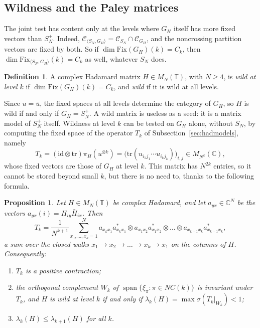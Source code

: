 \documentclass[11pt]{amsart}
\newtheorem{proposition}[theorem]{Proposition}
\theoremstyle{definition}
\newtheorem{definition}[theorem]{Definition}
\theoremstyle{remark}
\theoremstyle{plain}
\numberwithin{equation}{section}
\numberwithin{table}{section}
\newcommand{\C}{\mathbb C}
\newcommand{\T}{\mathbb T}
\newcommand{\Fix}{\mathrm{Fix}}
\DeclareMathOperator{\spn}{span}
\begin{document}
\subsection{Wildness and the Paley matrices}\label{sec:paley}

The joint test has content only at the levels where $G_H$ itself has more fixed vectors than $S_N^+$. Indeed, $\mathcal C_{\langle S_N,G_H\rangle}=\mathcal C_{S_N}\cap\mathcal C_{G_H}$, and the noncrossing partition vectors are fixed by both. So if $\dim\Fix(G_H)(k)=C_k$, then $\dim\Fix_{\langle S_N,G_H\rangle}(k)=C_k$ as well, whatever $S_N$ does.

\begin{definition}
A complex Hadamard matrix $H\in M_N(\T)$, with $N\ge4$, is \emph{wild at level $k$} if $\dim\Fix(G_H)(k)=C_k$, and \emph{wild} if it is wild at all levels.
\end{definition}

Since $u=\bar u$, the fixed spaces at all levels determine the category of $G_H$, so $H$ is wild if and only if $G_H=S_N^+$. A wild matrix is useless as a seed: it is a matrix model of $S_N^+$ itself. Wildness at level $k$ can be tested on $G_H$ alone, without $S_N$, by computing the fixed space of the operator $T_k$ of Subsection~\ref{sec:hadmodels}, namely
\[
T_k=(\mathrm{id}\otimes\mathrm{tr})\pi_H(u^{\otimes k})=\Big(\mathrm{tr}(u_{i_1j_1}\cdots u_{i_kj_k})\Big)_{i,j}\in M_{N^k}(\C),
\]
whose fixed vectors are those of $G_H$ at level $k$. This matrix has $N^{2k}$ entries, so it cannot be stored beyond small $k$, but there is no need to, thanks to the following formula.

\begin{proposition}\label{prop:walks}
Let $H\in M_N(\T)$ be complex Hadamard, and let $a_{yx}\in\C^N$ be the vectors $a_{yx}(i)=H_{iy}\bar H_{ix}$. Then
\[
T_k=\frac{1}{N^{k+1}}\sum_{x_1,\dots,x_k=1}^N a_{x_kx_1}a_{x_kx_1}^*\otimes a_{x_1x_2}a_{x_1x_2}^*\otimes\dots\otimes a_{x_{k-1}x_k}a_{x_{k-1}x_k}^*,
\]
a sum over the closed walks $x_1\to x_2\to\dots\to x_k\to x_1$ on the columns of $H$. Consequently:
\begin{enumerate}
\item $T_k$ is a positive contraction;
\item the orthogonal complement $W_k$ of $\spn\{\xi_\pi:\pi\in NC(k)\}$ is invariant under $T_k$, and $H$ is wild at level $k$ if and only if $\lambda_k(H)=\max\sigma(T_k|_{W_k})<1$;
\item $\lambda_k(H)\le\lambda_{k+1}(H)$ for all $k$.
\end{enumerate}
\end{proposition}
\end{document}
